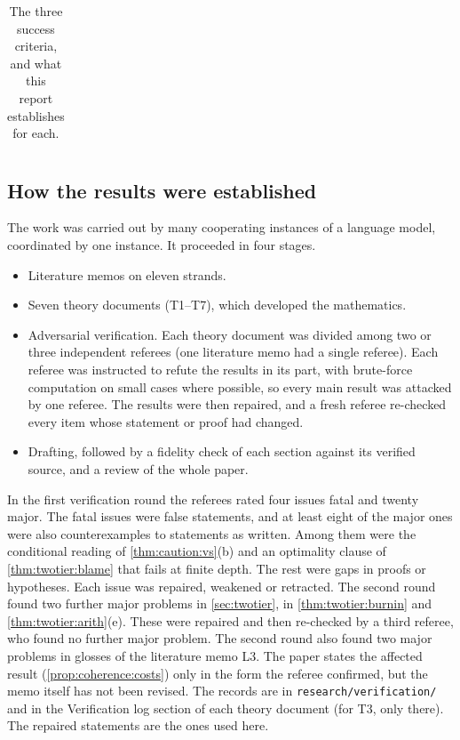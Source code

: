 \begin{table}[ht]
\begin{tabularx}{\textwidth}{>{\raggedright\arraybackslash}p{4.2cm}>{\raggedright\arraybackslash}X}
\bottomrule
\end{tabularx}
\caption{The three success criteria, and what this report establishes for each.}\label{tab:intro:answers}
\end{table}

\subsection{How the results were established}\label{sec:intro:method}

The work was carried out by many cooperating instances of a language model, coordinated by one instance. It proceeded in four stages.
\begin{itemize}
\item Literature memos on eleven strands.
\item Seven theory documents (T1--T7), which developed the mathematics.
\item Adversarial verification. Each theory document was divided among two or three independent referees (one literature memo had a single referee). Each referee was instructed to refute the results in its part, with brute-force computation on small cases where possible, so every main result was attacked by one referee. The results were then repaired, and a fresh referee re-checked every item whose statement or proof had changed.
\item Drafting, followed by a fidelity check of each section against its verified source, and a review of the whole paper.
\end{itemize}
In the first verification round the referees rated four issues fatal and twenty major. The fatal issues were false statements, and at least eight of the major ones were also counterexamples to statements as written. Among them were the conditional reading of \cref{thm:caution:vs}(b) and an optimality clause of \cref{thm:twotier:blame} that fails at finite depth. The rest were gaps in proofs or hypotheses. Each issue was repaired, weakened or retracted. The second round found two further major problems in \cref{sec:twotier}, in \cref{thm:twotier:burnin} and \cref{thm:twotier:arith}(e). These were repaired and then re-checked by a third referee, who found no further major problem. The second round also found two major problems in glosses of the literature memo L3. The paper states the affected result (\cref{prop:coherence:costs}) only in the form the referee confirmed, but the memo itself has not been revised. The records are in \texttt{research/verification/} and in the Verification log section of each theory document (for T3, only there). The repaired statements are the ones used here.

